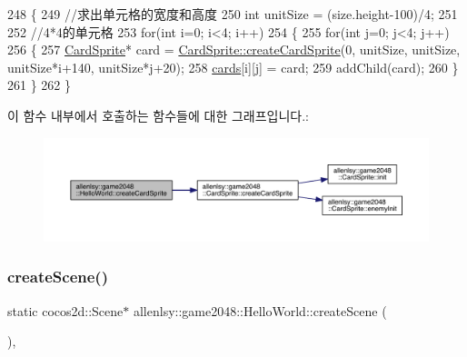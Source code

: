 \begin{DoxyCode}
248                                            \{
249         \textcolor{comment}{//求出单元格的宽度和高度}
250         \textcolor{keywordtype}{int} unitSize = (size.height-100)/4;
251         
252         \textcolor{comment}{//4*4的单元格}
253         \textcolor{keywordflow}{for}(\textcolor{keywordtype}{int} i=0; i<4; i++)
254         \{
255             \textcolor{keywordflow}{for}(\textcolor{keywordtype}{int} j=0; j<4; j++)
256             \{
257                 \hyperlink{classallenlsy_1_1game2048_1_1_card_sprite}{CardSprite}* card = \hyperlink{classallenlsy_1_1game2048_1_1_card_sprite_a3a14745470040dfb933397ccb83344d7}{CardSprite::createCardSprite}(0, 
      unitSize, unitSize, unitSize*i+140, unitSize*j+20);
258                 \hyperlink{classallenlsy_1_1game2048_1_1_hello_world_a1208d2de4b949d0b0f370b26f09fdf74}{cards}[i][j] = card;
259                 addChild(card);
260             \}
261         \}
262     \}
\end{DoxyCode}
이 함수 내부에서 호출하는 함수들에 대한 그래프입니다.\+:
\nopagebreak
\begin{figure}[H]
\begin{center}
\leavevmode
\includegraphics[width=350pt]{d5/d2b/classallenlsy_1_1game2048_1_1_hello_world_ad55dd12c9e76eba2e7c79dafbd103e54_cgraph}
\end{center}
\end{figure}
\mbox{\label{classallenlsy_1_1game2048_1_1_hello_world_a86ca8a563151e5e5d308f98ff6c36f95}} 
\subsubsection{\texorpdfstring{create\+Scene()}{createScene()}}
{\footnotesize\ttfamily static cocos2d\+::\+Scene$\ast$ allenlsy\+::game2048\+::\+Hello\+World\+::create\+Scene (\begin{DoxyParamCaption}{ }\end{DoxyParamCaption})\hspace{0.3cm}{\ttfamily [inline]}, {\ttfamily [static]}}



